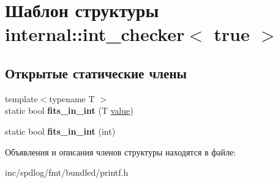 \hypertarget{structinternal_1_1int__checker_3_01true_01_4}{}\section{Шаблон структуры internal\+:\+:int\+\_\+checker$<$ true $>$}
\label{structinternal_1_1int__checker_3_01true_01_4}
\subsection*{Открытые статические члены}
\begin{DoxyCompactItemize}
\item 
\mbox{\label{structinternal_1_1int__checker_3_01true_01_4_a647ab37e3fdce73c988478434f3a8203}} 
{\footnotesize template$<$typename T $>$ }\\static bool {\bfseries fits\+\_\+in\+\_\+int} (T \hyperlink{classinternal_1_1value}{value})
\item 
\mbox{\label{structinternal_1_1int__checker_3_01true_01_4_a253ca9ccc6a67e83bc66276e75e798fb}} 
static bool {\bfseries fits\+\_\+in\+\_\+int} (int)
\end{DoxyCompactItemize}


Объявления и описания членов структуры находятся в файле\+:\begin{DoxyCompactItemize}
\item 
inc/spdlog/fmt/bundled/printf.\+h\end{DoxyCompactItemize}
